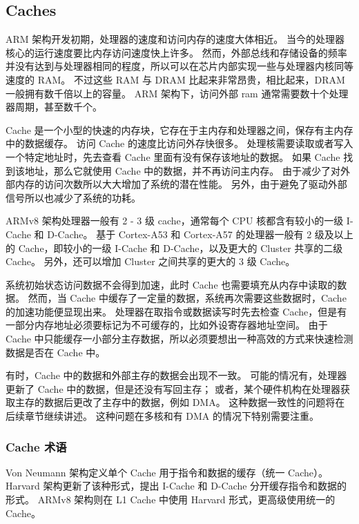 \subsection{Caches}\label{sec:caches}

ARM 架构开发初期，处理器的速度和访问内存的速度大体相近。
当今的处理器核心的运行速度要比内存访问速度快上许多。
然而，外部总线和存储设备的频率并没有达到与处理器相同的程度，所以可以在芯片内部实现一些与处理器内核同等速度的 RAM。
不过这些 RAM 与 DRAM 比起来非常昂贵，相比起来，DRAM 一般拥有数千倍以上的容量。
ARM 架构下，访问外部 ram 通常需要数十个处理器周期，甚至数千个。

Cache 是一个小型的快速的内存块，它存在于主内存和处理器之间，保存有主内存中的数据缓存。
访问 Cache 的速度比访问外存快很多。
处理核需要读取或者写入一个特定地址时，先去查看 Cache 里面有没有保存该地址的数据。
如果 Cache 找到该地址，那么它就使用 Cache 中的数据，并不再访问主内存。
由于减少了对外部内存的访问次数所以大大增加了系统的潜在性能。
另外，由于避免了驱动外部信号所以也减少了系统的功耗。


ARMv8 架构处理器一般有 2 - 3 级 cache，通常每个 CPU 核都含有较小的一级 I-Cache 和 D-Cache。
基于 Cortex-A53 和 Cortex-A57 的处理器一般有 2 级及以上的 Cache，即较小的一级 I-Cache 和 D-Cache，以及更大的 Cluster 共享的二级 Cache。
另外，还可以增加 Cluster 之间共享的更大的 3 级 Cache。

系统初始状态访问数据不会得到加速，此时 Cache 也需要填充从内存中读取的数据。
然而，当 Cache 中缓存了一定量的数据，系统再次需要这些数据时，Cache 的加速功能便显现出来。
处理器在取指令或数据读写时先去检查 Cache，但是有一部分内存地址必须要标记为不可缓存的，比如外设寄存器地址空间。
由于 Cache 中只能缓存一小部分主存数据，所以必须要想出一种高效的方式来快速检测数据是否在 Cache 中。

有时，Cache 中的数据和外部主存的数据会出现不一致。
可能的情况有，处理器更新了 Cache 中的数据，但是还没有写回主存；
或者，某个硬件机构在处理器获取主存的数据后更改了主存中的数据，例如 DMA。
这种数据一致性的问题将在后续章节继续讲述。
这种问题在多核和有 DMA 的情况下特别需要注重。

\subsubsection{Cache 术语}

Von Neumann 架构定义单个 Cache 用于指令和数据的缓存（统一 Cache）。
Harvard 架构更新了该种形式，提出 I-Cache 和 D-Cache 分开缓存指令和数据的形式。
ARMv8 架构则在 L1 Cache 中使用 Harvard 形式，更高级使用统一的 Cache。

